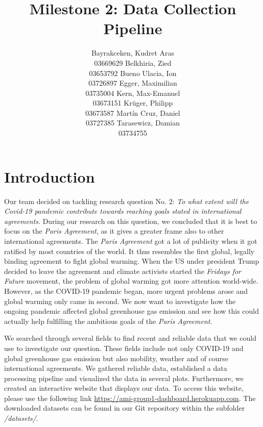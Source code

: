\documentclass{article}
\title{Milestone 2: Data Collection Pipeline}
\author{Bayrakceken, Kudret Aras\\
	03669629
	\And
	Belkhiria, Zied\\
	03653792
	\And
	Bueno Ulacia, Ion\\
	03726897
	\And
	Egger, Maximilian\\
	03735004
	\And
	Kern, Max-Emanuel\\
	03673151
	\And
	Krüger, Philipp \\
	03673587
	\And
	Martín Cruz, Daniel\\
	03727385
	\And
	Tarasewicz, Damian\\
	03734755
}
\begin{document}
\maketitle




\setcounter{tocdepth}{1}
\tableofcontents


\section{Introduction}

Our team decided on tackling research question No. 2: \textit{To what extent will the Covid-19 pandemic contribute towards reaching goals stated in international agreements}. During our research on this question, we concluded that it is best to focus on the \textit{Paris Agreement}, as it gives a greater frame also to other international agreements. The \textit{Paris Agreement} got a lot of publicity when it got ratified by most countries of the world. It thus resembles the first global, legally binding agreement to fight global warming. When the US under president Trump decided to leave the agreement and climate activists started the \textit{Fridays for Future } movement, the problem of global warming got more attention world-wide. However, as the COVID-19 pandemic began, more urgent problems arose and global warming only came in second. We now want to investigate how the ongoing pandemic affected global greenhouse gas emission and see how this could actually help fulfilling the ambitious goals of the \textit{Paris Agreement}.

We searched through several fields to find recent and reliable data that we could use to investigate our question. These fields include not only COVID-19 and global greenhouse gas emission but also mobility, weather and of course international agreements. We gathered reliable data, established a data processing pipeline and visualized the data in several plots. Furthermore, we created an interactive website that displays our data. To access this website, please use the following link \url{https://ami-group1-dashboard.herokuapp.com}. The downloaded datasets can be found in our Git repository within the subfolder \textit{/datasets/}.







%
\end{document}
